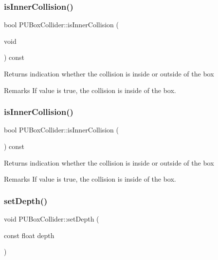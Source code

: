 \subsubsection{\texorpdfstring{is\+Inner\+Collision()}{isInnerCollision()}\hspace{0.1cm}{\footnotesize\ttfamily [1/2]}}
{\footnotesize\ttfamily bool P\+U\+Box\+Collider\+::is\+Inner\+Collision (\begin{DoxyParamCaption}\item[{void}]{ }\end{DoxyParamCaption}) const}

Returns indication whether the collision is inside or outside of the box \begin{DoxyRemark}{Remarks}
If value is true, the collision is inside of the box. 
\end{DoxyRemark}
\mbox{\label{classPUBoxCollider_ad6f759d90931e9221184688d362e5413}} 
\subsubsection{\texorpdfstring{is\+Inner\+Collision()}{isInnerCollision()}\hspace{0.1cm}{\footnotesize\ttfamily [2/2]}}
{\footnotesize\ttfamily bool P\+U\+Box\+Collider\+::is\+Inner\+Collision (\begin{DoxyParamCaption}{ }\end{DoxyParamCaption}) const}

Returns indication whether the collision is inside or outside of the box \begin{DoxyRemark}{Remarks}
If value is true, the collision is inside of the box. 
\end{DoxyRemark}
\mbox{\label{classPUBoxCollider_a932ec7d1d4a2bd823c2ce126ebb1dffe}} 
\subsubsection{\texorpdfstring{set\+Depth()}{setDepth()}\hspace{0.1cm}{\footnotesize\ttfamily [1/2]}}
{\footnotesize\ttfamily void P\+U\+Box\+Collider\+::set\+Depth (\begin{DoxyParamCaption}\item[{const float}]{depth }\end{DoxyParamCaption})}

